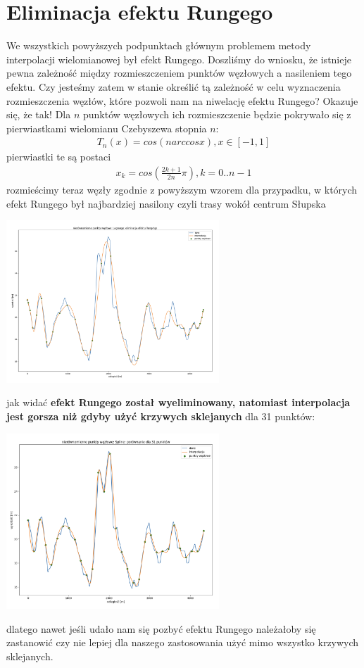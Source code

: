 \documentclass{article}
\begin{document}
\section{Eliminacja efektu Rungego}
We wszystkich powyższych podpunktach głównym problemem metody interpolacji wielomianowej był efekt Rungego. Doszliśmy do wniosku, że istnieje 
pewna zależność między rozmieszczeniem punktów węzłowych a nasileniem tego efektu. Czy jesteśmy zatem w stanie określić tą zależność w celu wyznaczenia
rozmieszczenia węzłów, które pozwoli nam na niwelację efektu Rungego? Okazuje się, że tak! Dla $n$ punktów węzłowych ich rozmieszczenie będzie pokrywało się
z pierwiastkami wielomianu Czebyszewa stopnia $n$:
\begin{gather*}
	T_n(x) = cos(narccos x), x \in [-1, 1]
\end{gather*}
pierwiastki te są postaci
\begin{gather*}
	x_k = cos(\frac{2k+1}{2n} \pi), k= 0..n-1
\end{gather*}
rozmieścimy teraz węzły zgodnie z powyższym wzorem dla przypadku, w których efekt Rungego był najbardziej nasilony czyli trasy wokół centrum Słupska
 \begin{center}
	\includegraphics[width=8cm]{lagrange_runge_gone}
\end{center}
jak widać \textbf{efekt Rungego został wyeliminowany, natomiast interpolacja jest gorsza niż gdyby użyć krzywych sklejanych} dla 31 punktów:
 \begin{center}
	\includegraphics[width=8cm]{spline_runge_comparison}
\end{center}
dlatego nawet jeśli udało nam się pozbyć efektu Rungego należałoby się zastanowić czy nie lepiej dla naszego zastosowania użyć mimo wszystko krzywych sklejanych.
\end{document}
